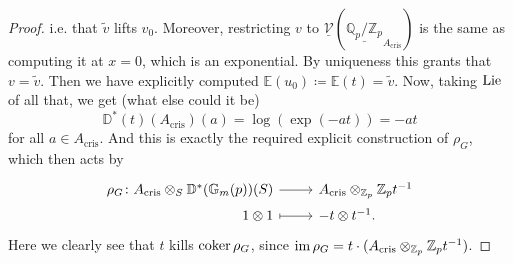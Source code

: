 \begin{proof}
	i.e. that $\widetilde{v}$ lifts $v_0$.
	Moreover, restricting $v$ to $\underline{\mathcal{V}}
	(\underline{\mathbb{Q}_p/\mathbb{Z}_{p}}_{A_{\mathrm{cris}}})$ 
	is the same as computing it at $x=0$, which is an exponential.
	By uniqueness this grants that $v = \widetilde{v}$.
	Then we have explicitly computed $\mathbb{E}(u_0) \coloneqq \mathbb{E}(t) = \widetilde{v}$.
	Now, taking $\operatorname{Lie}$ of all that, we get (what else could it be)
	\begin{equation*}
		\mathbb{D}^*(t)(A_{\mathrm{cris}})(a) = \log \left( \exp (-at) \right) = -at
	\end{equation*}
	for all $a \in A_{\mathrm{cris}}$.
	And this is exactly the required explicit construction of $\rho_G$, which
	then acts by
	\begin{equation*}
	\begin{tikzcd}[row sep = 0ex
		,/tikz/column 1/.append style={anchor=base east}
		,/tikz/column 2/.append style={anchor=base west}]
		\rho_G\colon 
		A_{\mathrm{cris}} \otimes_S \mathbb{D}^*(\mathbb{G}_m(p))(S)
		\arrow[r, "", rightarrow] &
		A_{\mathrm{cris}} \otimes_{\mathbb{Z}_{p}} \mathbb{Z}_{p} t^{-1} \\
		1 \otimes 1 \arrow[r, "", mapsto] & -t \otimes t^{-1}
	.\end{tikzcd}
	\end{equation*} 
	Here we clearly see that $t$ kills $\operatorname{coker} \rho_G$, since
	$\operatorname{im} \rho_G = t \cdot (A_{\mathrm{cris}} \otimes_{\mathbb{Z}_{p}} \mathbb{Z}_{p} t^{-1})$.


\end{proof}
